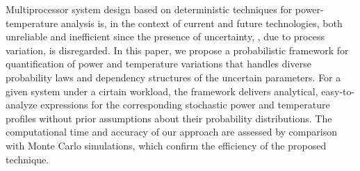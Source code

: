 Multiprocessor system design based on deterministic techniques for power-temperature analysis is, in the context of current and future technologies, both unreliable and inefficient since the presence of uncertainty, \eg, due to process variation, is disregarded. In this paper, we propose a probabilistic framework for quantification of power and temperature variations that handles diverse probability laws and dependency structures of the uncertain parameters. For a given system under a cirtain workload, the framework delivers analytical, easy-to-analyze expressions for the corresponding stochastic power and temperature profiles without prior assumptions about their probability distributions. The computational time and accuracy of our approach are assessed by comparison with Monte Carlo simulations, which confirm the efficiency of the proposed technique.
